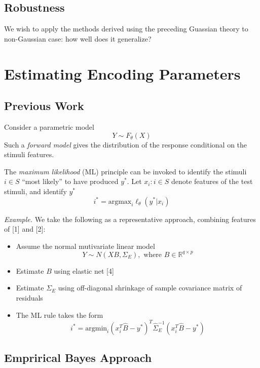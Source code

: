 \documentclass[12pt]{article}
\begin{document}
\subsection{Robustness}

We wish to apply the methods derived using the preceding Guassian
theory to non-Gaussian case: how well does it generalize?

\section{Estimating Encoding Parameters}

\subsection{Previous Work}

Consider a parametric model
\[
Y \sim F_\theta(X)
\]
Such a \emph{forward model} gives the distribution of the
response conditional on the stimuli features.

The \emph{maximum likelihood} (ML) principle can be invoked to
identify the stimuli $i \in S$ ``most likely'' to have produced $y^*$.
Let $x_i : i \in S$ denote features of the test stimuli, and
identify $y^*$
\[
i^* = \text{argmax}_i \ell_\theta(y^*| x_i)
\]

\emph{Example.} We take the following as a representative approach, combining features of [1] and [2]:
\begin{itemize}
\item Assume the normal mutivariate linear model
\[Y \sim N( XB , \Sigma_E), \text{ where }B \in \mathbb{R}^{q \times p}\]
\item Estimate $B$ using elastic net [4]
\item Estimate $\Sigma_E$ using off-diagonal shrinkage of sample covariance matrix of residuals
\item The ML rule takes the form
\begin{equation}\label{mlrule}
i^* = \text{argmin}_{i} (x_i^T \hat{B} - y^*)^T \hat{\Sigma}_E^{-1} (x_i^T \hat{B} - y^*)
\end{equation}
\end{itemize}

\subsection{Emprirical Bayes Approach}
\end{document}
